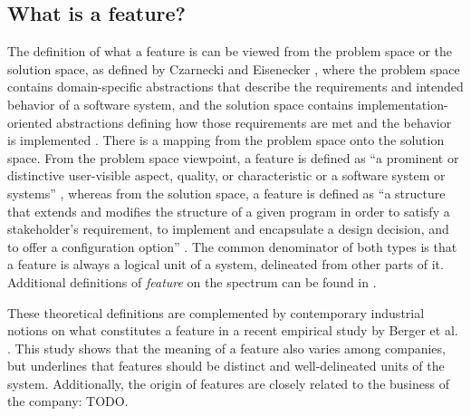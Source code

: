 \subsection{What is a feature?}
The definition of what a feature is can be viewed from the problem space or the solution space, as defined by Czarnecki and Eisenecker \cite{czarnecki2000generative}, where the problem space contains domain-specific abstractions that describe the requirements  and intended behavior of a software system, and the solution space contains implementation-oriented abstractions defining how those requirements are met and the behavior is implemented \cite{apel2009overview}. There is a mapping from the problem space onto the solution space. From the problem space viewpoint, a feature is defined as ``a prominent or distinctive user-visible aspect, quality, or characteristic or a software system or systems'' \cite{kang1990feature}, whereas from the solution space, a feature is defined as ``a structure that extends and modifies the structure of a given program in order to satisfy a stakeholder's requirement, to implement and encapsulate a design decision, and to offer a configuration option'' \cite{apel2008algebra}.
The common denominator of both types is that a feature is always a logical unit of a system, delineated from other parts of it. Additional definitions of \textit{feature} on the spectrum can be found in \cite{apel2009overview} .

These theoretical definitions are complemented by contemporary industrial notions on what constitutes a feature in a recent empirical study by Berger et al. \cite{berger2015feature}. This study shows that the meaning of a feature also varies among companies, but underlines that features should be distinct and well-delineated units of the system. Additionally, the origin of features are closely related to the business of the company: TODO.


